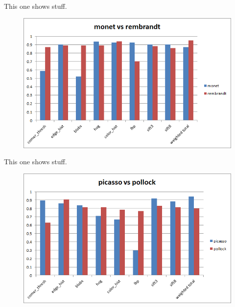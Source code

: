 \documentclass[twocolumn]{article}
\begin{document}
  This one shows stuff.
  \begin{figure}
    \begin{center}
      \includegraphics{graphs/monet_rembrandt.png}
    \end{center}
  \end{figure}

  This one shows stuff.
  \begin{figure}
    \begin{center}
      \includegraphics{graphs/picasso_pollock.png}
    \end{center}
  \end{figure}
\end{document}
